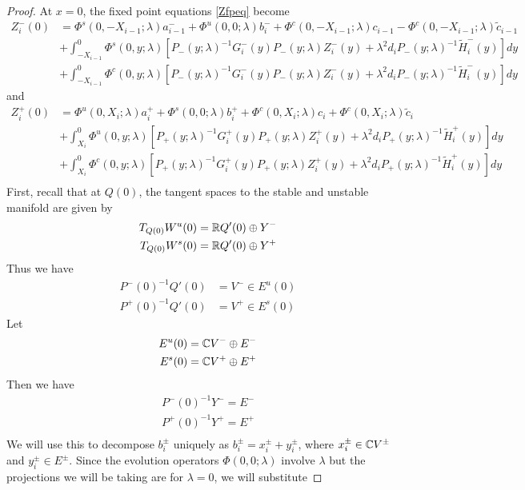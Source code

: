 \documentclass[thesis.tex]{subfiles}
\begin{document}
\begin{lemma}
\begin{proof}
At $x = 0$, the fixed point equations \eqref{Zfpeq} become
\begin{align*}
Z_i^-(0) &= \Phi^s(0, -X_{i-1}; \lambda) a_{i-1}^- + \Phi^u(0, 0; \lambda) b_i^- + \Phi^c(0, -X_{i-1}; \lambda) c_{i-1} -\Phi^c(0, -X_{i-1}; \lambda) \tilde{c}_{i-1} \\
&+ \int_{-X_{i-1}}^0 \Phi^s(0, y; \lambda)[P_-(y; \lambda)^{-1} G_i^-(y) P_-(y; \lambda)Z_i^-(y) + \lambda^2 d_i P_-(y; \lambda)^{-1} \tilde{H}_i^-(y)] dy \\
&+ \int_{-X_{i-1}}^0 \Phi^c(0, y; \lambda) [P_-(y; \lambda)^{-1} G_i^-(y) P_-(y; \lambda)Z_i^-(y) + \lambda^2 d_i P_-(y; \lambda)^{-1} \tilde{H}_i^-(y)] dy
\end{align*}
and
\begin{align*}
Z_i^+(0) &= \Phi^u(0, X_i; \lambda) a_i^+ + \Phi^s(0, 0; \lambda) b_i^+ + \Phi^c(0, X_i; \lambda) c_i + \Phi^c(0, X_i; \lambda) \tilde{c}_i \\
&+ \int_{X_i}^0 \Phi^u(0, y; \lambda) [P_+(y; \lambda)^{-1} G_i^+(y) P_+(y; \lambda) Z_i^+(y) + \lambda^2 d_i P_+(y; \lambda)^{-1} \tilde{H}_i^+(y)] dy \\
&+ \int_{X_i}^0 \Phi^c(0, y; \lambda) [P_+(y; \lambda)^{-1} G_i^+(y) P_+(y; \lambda) Z_i^+(y) + \lambda^2 d_i P_+(y; \lambda)^{-1} \tilde{H}_i^+(y)] dy \\
\end{align*}
First, recall that at $Q(0)$, the tangent spaces to the stable and unstable manifold are given by
\begin{align*}
T_{Q(0)} W^u(0) &= \mathbb{R} Q'(0) \oplus Y^- \\
T_{Q(0)} W^s(0) &= \mathbb{R} Q'(0) \oplus Y^+
\end{align*}
Thus we have
\begin{align*}
P^-(0)^{-1} Q'(0) &= V^- \in E^u(0) \\
P^+(0)^{-1} Q'(0) &= V^+ \in E^s(0)
\end{align*}
Let
\begin{align*}
E^u(0) &= \mathbb{C} V^- \oplus E^- \\
E^s(0) &= \mathbb{C} V^+ \oplus E^+ \\
\end{align*}
Then we have
\begin{align*}
P^-(0)^{-1} Y^- = E^- \\
P^+(0)^{-1} Y^+ = E^+ \\
\end{align*}
We will use this to decompose $b_i^\pm$ uniquely as $b_i^\pm = x_i^\pm + y_i^\pm$, where $x_i^\pm \in \mathbb{C} V^\pm$ and $y_i^\pm \in E^\pm$. Since the evolution operators $\Phi(0, 0; \lambda)$ involve $\lambda$ but the projections we will be taking are for $\lambda = 0$, we will substitute

\end{proof}
\end{lemma}
\end{document}
